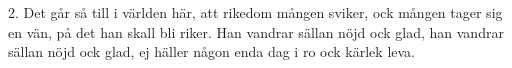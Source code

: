 2.  Det går så till i världen här,
    att rikedom mången sviker,
    ock mången tager sig en vän,
    på det han skall bli riker.
    Han vandrar sällan nöjd ock glad,
    han vandrar sällan nöjd ock glad,
    ej häller någon enda dag
    i ro ock kärlek leva.
